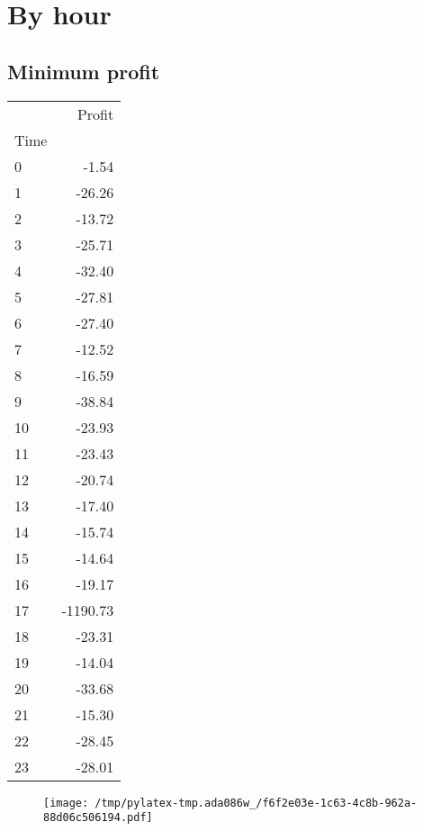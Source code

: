 \documentclass{article}%
\begin{document}
%
\newpage %
\section{By hour}%
\label{sec:Byhour}%
\subsection{Minimum profit }%
\label{subsec:Minimumprofit}%
\begin{tabular}{lr}
\toprule
{} &   Profit \\
Time &          \\
\midrule
0    &    -1.54 \\
1    &   -26.26 \\
2    &   -13.72 \\
3    &   -25.71 \\
4    &   -32.40 \\
5    &   -27.81 \\
6    &   -27.40 \\
7    &   -12.52 \\
8    &   -16.59 \\
9    &   -38.84 \\
10   &   -23.93 \\
11   &   -23.43 \\
12   &   -20.74 \\
13   &   -17.40 \\
14   &   -15.74 \\
15   &   -14.64 \\
16   &   -19.17 \\
17   & -1190.73 \\
18   &   -23.31 \\
19   &   -14.04 \\
20   &   -33.68 \\
21   &   -15.30 \\
22   &   -28.45 \\
23   &   -28.01 \\
\bottomrule
\end{tabular}
%


\begin{figure}[htbp]%
\centering%
\texttt{[image: /tmp/pylatex-tmp.ada086w\_/f6f2e03e-1c63-4c8b-962a-88d06c506194.pdf]}%
\end{figure}

%
\newpage %
\end{document}
